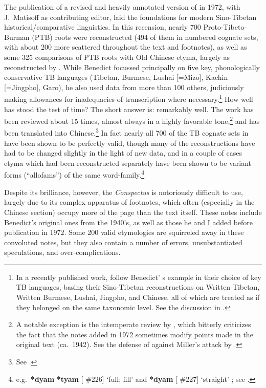 The publication of a revised and heavily annotated version of \textit{} in 1972, with J.\ Matisoff as contributing editor, laid the foundations for modern Sino-Tibetan historical/\allowbreak{}comparative linguistics. In this recension, nearly 700 Proto-Tibeto-Burman (PTB) roots were reconstructed (494 of them in numbered cognate sets, with about 200 more scattered throughout the text and footnotes), as well as some 325 comparisons of PTB roots with Old Chinese etyma, largely as reconstructed by \citet{GSR}. While Benedict focussed principally on five key, phonologically conservative TB languages (Tibetan, Burmese, Lushai [=Mizo], Kachin [=Jingpho], Garo), he also used data from more than 100 others, judiciously making allowances for inadequacies of transcription where necessary.\footnote{In a recently published work, \citet{PS-STL} follow Benedict’ s example in their choice of key TB languages, basing their Sino-Tibetan reconstructions on Written Tibetan, Written Burmese, Lushai, Jingpho, and Chinese, all of which are treated as if they belonged on the same taxonomic level. See the discussion in \citet[ch.\ 3]{ZH-OCST98}.} How well has \textit{} stood the test of time? The short answer is: remarkably well. The work has been reviewed about 15 times, almost always in a highly favorable tone,\footnote{A notable exception is the intemperate review by \citet{RAM-STIC}, which bitterly criticizes the fact that the notes added in 1972 sometimes modify points made in the original text (ca.\ 1942). See the defense of \textit{} against Miller’s attack by \citet{JAM-BST}.} and has been translated into Chinese.\footnote{See \citealt{HZYG}.} In fact nearly all 700 of the TB cognate sets in \textit{} have been shown to be perfectly valid, though many of the reconstructions have had to be changed slightly in the light of new data, and in a couple of cases etyma which had been reconstructed separately have been shown to be variant forms (“allofams”) of the same word-family.\footnote{e.g.\ \textbf{*dyam}  \textbf{*tyam} [\textit{} $\#$226] ‘full; fill’ and \textbf{*dyam} [\textit{} $\#$227] ‘straight’ ; see \citet{JAM-USAI}.}

Despite its brilliance, however, the {\it Conspectus} is notoriously difficult to use, largely due to its complex apparatus of footnotes, which often (especially in the Chinese section) occupy more of the page than the text itself. These notes include Benedict’s original ones from the 1940’s, as well as those he and I added before publication in 1972. Some 200 valid etymologies are squirreled away in these convoluted notes, but they also contain a number of errors, unsubstantiated speculations, and over-complications.

